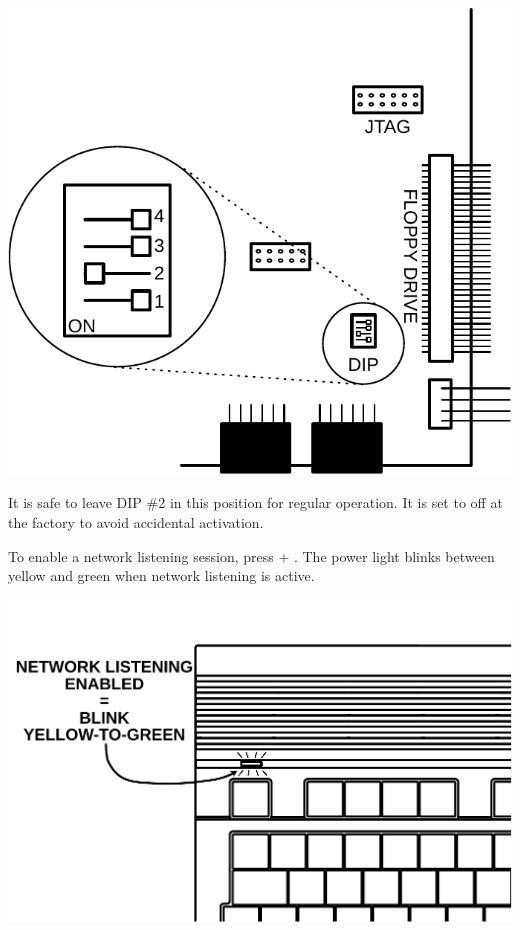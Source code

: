 \begin{center}
\includegraphics[width=\linewidth]{images/illustrations/mega65-dip2.pdf}
\end{center}

It is safe to leave DIP \#2 in this position for regular operation. It is set to off at the factory to avoid accidental activation.

To enable a network listening session, press  + \megakey{\pounds}. The power light blinks between yellow and green when network listening is active.

\begin{center}
\includegraphics[width=\linewidth]{images/illustrations/mega65-eth-blink.pdf}
\end{center}

